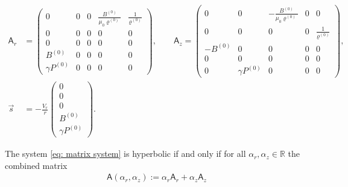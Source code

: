 \begin{align}
    \mathsf{A}_r &=
    \begin{pmatrix}
    0           & 0 & 0 & \frac{B^{(0)}}{\mu_0\varrho^{(0)}} & \frac{1}{\varrho^{(0)}} \\
    0           & 0 & 0 & 0 & 0 \\
    0           & 0 & 0 & 0 & 0 \\
    B^{(0)}        & 0 & 0 & 0 & 0 \\
    \gamma P^{(0)} & 0 & 0 & 0 & 0
    \end{pmatrix},
    \qquad
    \mathsf{A}_z =
    \begin{pmatrix}
        0    & 0            & -\frac{B^{(0)}}{\mu_0\varrho^{(0)}} & 0 & 0            \\
        0    & 0            & 0 & 0                        & \frac{1}{\varrho^{(0)}} \\
        -B^{(0)} & 0            & 0 & 0                        & 0 \\
        0    & 0            & 0 & 0                        & 0 \\
        0    & \gamma P^{(0)}   & 0 & 0                        & 0
    \end{pmatrix},
    \\
    \vec{s} &= -
    \frac{V_r}{r}
    \begin{pmatrix}
        0 \\ 0 \\ 0 \\ B^{(0)} \\ \gamma P^{(0)}
    \end{pmatrix}.
\end{align}



The system \eqref{eq: matrix system} is hyperbolic if and only if for all
$\alpha_r, \alpha_z \in \mathbb{R}$ the combined matrix
\begin{align}
    \mathsf{A}(\alpha_r, \alpha_z) := \alpha_r \mathsf{A}_r + \alpha_z \mathsf{A}_z
\end{align}

